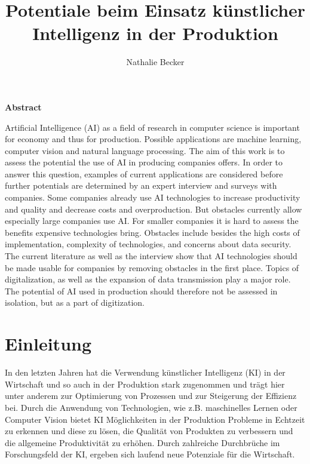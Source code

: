 \documentclass[a4paper,12pt, german]{report}
\begin{document}
\title{Potentiale beim Einsatz künstlicher Intelligenz in der Produktion}
\author{Nathalie Becker}


\begin{titlepage}
\maketitle
\end{titlepage}


\begin{center}
\textbf{Abstract}
\end{center}
Artificial Intelligence (AI) as a field of research in computer science is important for economy and thus for production. Possible applications are machine learning, computer vision and natural language processing. The aim of this work is to assess the potential the use of AI in producing companies offers. In order to answer this question, examples of current applications are considered before further potentials are determined by an expert interview and surveys with companies. Some companies already use AI technologies to increase productivity and quality and decrease costs and overproduction. But obstacles currently allow especially large companies use AI. For smaller companies it is hard to assess the benefits expensive technologies bring. Obstacles include besides the high costs of implementation, complexity of technologies, and concerns about data security. The current literature as well as the interview show that AI technologies should be made usable for companies by removing obstacles in the first place. Topics of digitalization, as well as the expansion of data transmission play a major role. The potential of AI used in production should therefore not be assessed in isolation, but as a part of digitization. 


\tableofcontents

\chapter{Einleitung}

In den letzten Jahren hat die Verwendung künstlicher Intelligenz (KI) in der Wirtschaft und so auch in der Produktion stark zugenommen und trägt hier unter anderem zur Optimierung von Prozessen und zur Steigerung der Effizienz bei. Durch die Anwendung von Technologien, wie z.B. maschinelles Lernen oder Computer Vision bietet KI Möglichkeiten in der Produktion Probleme in Echtzeit zu erkennen und diese zu lösen, die Qualität von Produkten zu verbessern und die allgemeine Produktivität zu erhöhen. Durch zahlreiche Durchbrüche im Forschungsfeld der KI, ergeben sich laufend neue Potenziale für die Wirtschaft. 
\end{document}
